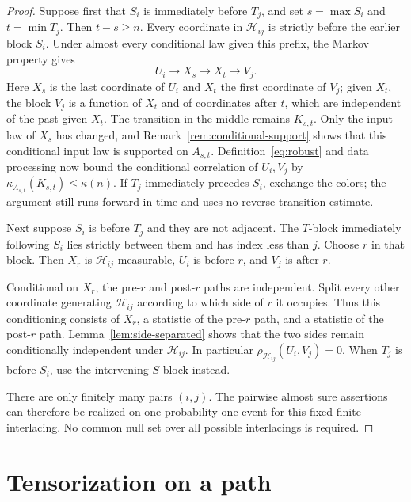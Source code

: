 \documentclass[11pt]{amsart}
\numberwithin{equation}{section}
\theoremstyle{definition}
\newcommand{\cH}{\mathcal H}
\begin{document}
\begin{proof}
Suppose first that $S_i$ is immediately before $T_j$, and set $s=\max S_i$ and $t=\min T_j$. Then $t-s\ge n$. Every coordinate in $\cH_{ij}$ is strictly before the earlier block $S_i$. Under almost every conditional law given this prefix, the Markov property gives
\begin{equation}\label{eq:conditional-chain}
U_i\longrightarrow X_s\longrightarrow X_t\longrightarrow V_j.
\end{equation}
Here $X_s$ is the last coordinate of $U_i$ and $X_t$ the first coordinate of $V_j$; given $X_t$, the block $V_j$ is a function of $X_t$ and of coordinates after $t$, which are independent of the past given $X_t$. The transition in the middle remains $K_{s,t}$. Only the input law of $X_s$ has changed, and Remark~\ref{rem:conditional-support} shows that this conditional input law is supported on $A_{s,t}$. Definition~\eqref{eq:robust} and data processing now bound the conditional correlation of $U_i,V_j$ by $\kappa_{A_{s,t}}(K_{s,t})\le\kappa(n)$. If $T_j$ immediately precedes $S_i$, exchange the colors; the argument still runs forward in time and uses no reverse transition estimate.

Next suppose $S_i$ is before $T_j$ and they are not adjacent. The $T$-block immediately following $S_i$ lies strictly between them and has index less than $j$. Choose $r$ in that block. Then $X_r$ is $\cH_{ij}$-measurable, $U_i$ is before $r$, and $V_j$ is after $r$.

Conditional on $X_r$, the pre-$r$ and post-$r$ paths are independent. Split every other coordinate generating $\cH_{ij}$ according to which side of $r$ it occupies. Thus this conditioning consists of $X_r$, a statistic of the pre-$r$ path, and a statistic of the post-$r$ path. Lemma~\ref{lem:side-separated} shows that the two sides remain conditionally independent under $\cH_{ij}$. In particular $\rho_{\cH_{ij}}(U_i,V_j)=0$. When $T_j$ is before $S_i$, use the intervening $S$-block instead.

There are only finitely many pairs $(i,j)$. The pairwise almost sure assertions can therefore be realized on one probability-one event for this fixed finite interlacing. No common null set over all possible interlacings is required.
\end{proof}

\section{Tensorization on a path}\label{sec:tensorization}
\end{document}
